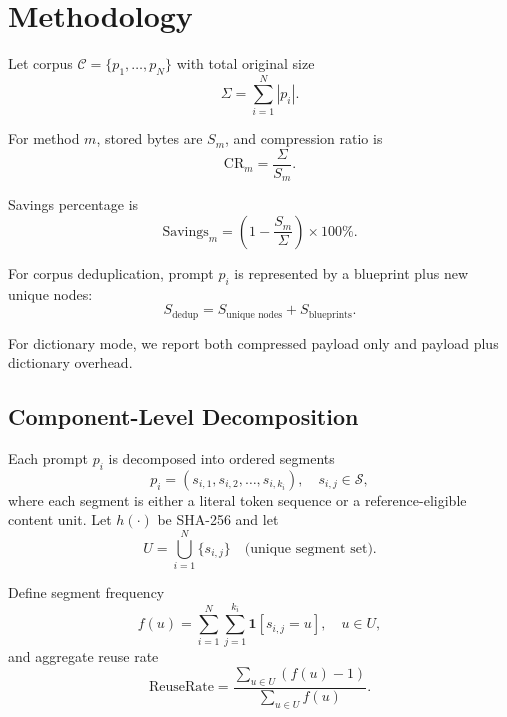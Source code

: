 \documentclass[10pt,conference]{IEEEtran}
\begin{document}
\section{Methodology}
Let corpus $\mathcal{C}=\{p_1,\dots,p_N\}$ with total original size
\begin{equation}
\Sigma = \sum_{i=1}^{N}|p_i|.
\end{equation}

For method $m$, stored bytes are $S_m$, and compression ratio is
\begin{equation}
\text{CR}_m = \frac{\Sigma}{S_m}.
\end{equation}

Savings percentage is
\begin{equation}
\text{Savings}_m = \left(1-\frac{S_m}{\Sigma}\right)\times 100\%.
\end{equation}

For corpus deduplication, prompt $p_i$ is represented by a blueprint plus new unique nodes:
\begin{equation}
S_{\text{dedup}} = S_{\text{unique nodes}} + S_{\text{blueprints}}.
\end{equation}

For dictionary mode, we report both compressed payload only and payload plus dictionary overhead.

\subsection{Component-Level Decomposition}
Each prompt $p_i$ is decomposed into ordered segments
\begin{equation}
p_i = (s_{i,1}, s_{i,2}, \dots, s_{i,k_i}), \quad s_{i,j} \in \mathcal{S},
\end{equation}
where each segment is either a literal token sequence or a reference-eligible content unit. Let $h(\cdot)$ be SHA-256 and let
\begin{equation}
U = \bigcup_{i=1}^{N}\{s_{i,j}\} \quad \text{(unique segment set)}.
\end{equation}

Define segment frequency
\begin{equation}
f(u)=\sum_{i=1}^{N}\sum_{j=1}^{k_i} \mathbf{1}[s_{i,j}=u], \quad u\in U,
\end{equation}
and aggregate reuse rate
\begin{equation}
\text{ReuseRate}=\frac{\sum_{u\in U}(f(u)-1)}{\sum_{u\in U}f(u)}.
\end{equation}
\end{document}
